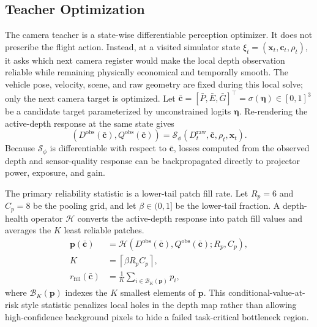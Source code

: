 \documentclass[letterpaper,journal]{IEEEtran}
\begin{document}
\subsection{Teacher Optimization}
The camera teacher is a state-wise differentiable perception optimizer. It does
not prescribe the flight action. Instead, at a visited simulator state
$\xi_t=(\mathbf{x}_t,\mathbf{c}_t,\rho_t)$, it asks which next camera register
would make the local depth observation reliable while remaining physically
economical and temporally smooth. The vehicle pose, velocity, scene, and raw
geometry are fixed during this local solve; only the next camera target is
optimized. Let
$\bar{\mathbf{c}}=[\bar P,\bar E,\bar G]^\top
=\sigma(\boldsymbol{\eta})\in[0,1]^3$ be a candidate target parameterized by
unconstrained logits $\boldsymbol{\eta}$. Re-rendering the active-depth
response at the same state gives
\begin{equation}
    (D^{\mathrm{obs}}(\bar{\mathbf{c}}),
    Q^{\mathrm{obs}}(\bar{\mathbf{c}}))
    =
    \mathcal{S}_{\phi}
    (D_t^{\mathrm{raw}},\bar{\mathbf{c}},\rho_t,\mathbf{x}_t).
    \label{eq:teacher_sensor_eval}
\end{equation}
Because $\mathcal{S}_{\phi}$ is differentiable with respect to
$\bar{\mathbf{c}}$, losses computed from the observed depth and sensor-quality
response can be backpropagated directly to projector power, exposure, and gain.

The primary reliability statistic is a lower-tail patch fill rate. Let
$R_p=6$ and $C_p=8$ be the pooling grid, and let
$\beta\in(0,1]$ be the lower-tail fraction. A depth-health operator
$\mathcal{H}$ converts the active-depth response into patch fill values
and averages the $K$ least reliable patches.
\begin{align}
    \mathbf{p}(\bar{\mathbf{c}})
    &=\mathcal{H}
    \left(D^{\mathrm{obs}}(\bar{\mathbf{c}}),
    Q^{\mathrm{obs}}(\bar{\mathbf{c}});R_p,C_p\right),\\
    K&=\left\lceil \beta R_p C_p\right\rceil,\\
    r_{\mathrm{fill}}(\bar{\mathbf{c}})
    &=\frac{1}{K}\sum_{i\in\mathcal{B}_K(\mathbf{p})}p_i ,
    \label{eq:fill_cvar}
\end{align}
where $\mathcal{B}_K(\mathbf{p})$ indexes the $K$ smallest elements of
$\mathbf{p}$. This conditional-value-at-risk style statistic penalizes local
holes in the depth map rather than allowing high-confidence background pixels
to hide a failed task-critical bottleneck region.
\end{document}
